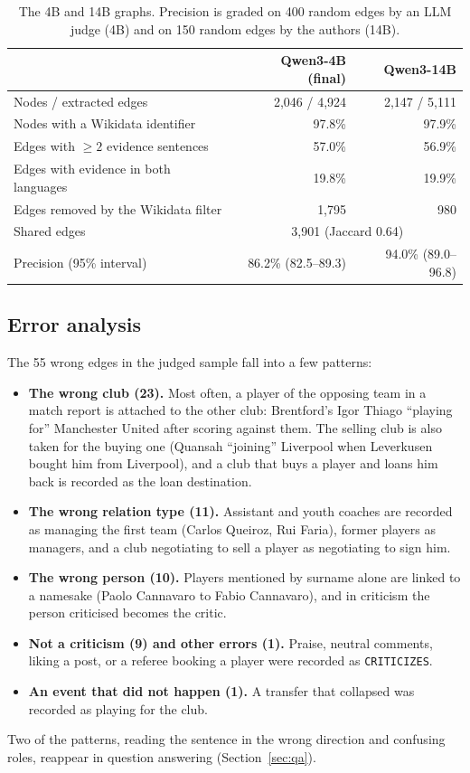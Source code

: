 \documentclass[11pt]{article}
\begin{document}
\begin{table}[t]\centering\small
\caption{The 4B and 14B graphs. Precision is graded on 400 random edges by an LLM judge (4B) and on 150 random edges by the authors (14B).}
\label{tab:graphs}
\begin{tabular}{@{}lrr@{}}\toprule
& Qwen3-4B (final) & Qwen3-14B\\\midrule
Nodes / extracted edges & 2,046 / 4,924 & 2,147 / 5,111\\
Nodes with a Wikidata identifier & 97.8\% & 97.9\%\\
Edges with $\geq 2$ evidence sentences & 57.0\% & 56.9\%\\
Edges with evidence in both languages & 19.8\% & 19.9\%\\
Edges removed by the Wikidata filter & 1,795 & 980\\
Shared edges & \multicolumn{2}{c}{3,901 (Jaccard 0.64)}\\
Precision (95\% interval) & 86.2\% (82.5--89.3) & 94.0\% (89.0--96.8)\\\bottomrule
\end{tabular}
\end{table}

\subsection{Error analysis}
The 55 wrong edges in the judged sample fall into a few patterns:
\begin{itemize}
\item \textbf{The wrong club (23).} Most often, a player of the opposing team in a match report is attached to the other club: Brentford's Igor Thiago ``playing for'' Manchester United after scoring against them. The selling club is also taken for the buying one (Quansah ``joining'' Liverpool when Leverkusen bought him from Liverpool), and a club that buys a player and loans him back is recorded as the loan destination.
\item \textbf{The wrong relation type (11).} Assistant and youth coaches are recorded as managing the first team (Carlos Queiroz, Rui Faria), former players as managers, and a club negotiating to sell a player as negotiating to sign him.
\item \textbf{The wrong person (10).} Players mentioned by surname alone are linked to a namesake (Paolo Cannavaro to Fabio Cannavaro), and in criticism the person criticised becomes the critic.
\item \textbf{Not a criticism (9) and other errors (1).} Praise, neutral comments, liking a post, or a referee booking a player were recorded as \texttt{CRITICIZES}.
\item \textbf{An event that did not happen (1).} A transfer that collapsed was recorded as playing for the club.
\end{itemize}
Two of the patterns, reading the sentence in the wrong direction and confusing roles, reappear in question answering (Section~\ref{sec:qa}).
\end{document}
